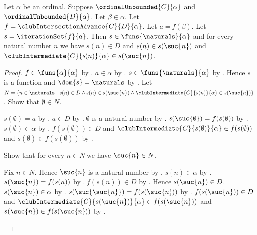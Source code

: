 \begin{proposition}\label{club_intersection_iteration_properties}
    Let $\alpha$ be an ordinal.
    Suppose $\ordinalUnbounded{C}{\alpha}$ and
        $\ordinalUnbounded{D}{\alpha}$.
    Let $\beta\in\alpha$.
    Let $f=\clubIntersectionAdvance{C}{D}{\alpha}$.
    Let $a=f(\beta)$.
    Let $s=\iterationSet{f}{a}$.
    Then $s\in\funs{\naturals}{\alpha}$ and
        for every natural number $n$ we have
            $s(n)\in D$ and $s(n)\in s(\suc{n})$ and
            $\clubIntermediate{C}{s(n)}{\alpha}\in s(\suc{n})$.
\end{proposition}
\begin{proof}
    $f\in\funs{\alpha}{\alpha}$
        by .
    $a\in\alpha$ by .
    $s\in\funs{\naturals}{\alpha}$
        by .
    Hence $s$ is a function and $\dom{s}=\naturals$
        by .
    Let $N=\{n\in\naturals\mid
        s(n)\in D\land s(n)\in s(\suc{n})\land
        \clubIntermediate{C}{s(n)}{\alpha}\in s(\suc{n})\}$.
    Show that $\emptyset\in N$.
    \begin{subproof}
        $s(\emptyset)=a$ by .
        $a\in D$ by .
        $\emptyset$ is a natural number by .
        $s(\suc{\emptyset})=f(s(\emptyset))$
            by .
        $s(\emptyset)\in\alpha$ by .
        $f(s(\emptyset))\in D$ and
            $\clubIntermediate{C}{s(\emptyset)}{\alpha}
                \in f(s(\emptyset))$ and
            $s(\emptyset)\in f(s(\emptyset))$
            by .
    \end{subproof}
    Show that for every $n\in N$ we have $\suc{n}\in N$.
    \begin{subproof}
        Fix $n\in N$.
        Hence $\suc{n}$ is a natural number by .
        $s(n)\in\alpha$ by .
        $s(\suc{n})=f(s(n))$
            by .
        $f(s(n))\in D$ by
            .
        Hence $s(\suc{n})\in D$.
        $s(\suc{n})\in\alpha$ by .
        $s(\suc{\suc{n}})=f(s(\suc{n}))$
            by .
        $f(s(\suc{n}))\in D$ and
            $\clubIntermediate{C}{s(\suc{n})}{\alpha}
                \in f(s(\suc{n}))$ and
            $s(\suc{n})\in f(s(\suc{n}))$
            by .

\end{subproof}
\end{proof}
